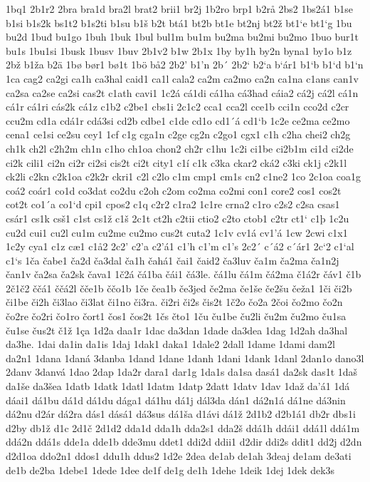 1bq1
2b1r2
2bra
bra1d
bra2l
brat2
brii1
br2j
1b2ro
brp1
b2rå
2bs2
1bs2á1
b1se
b1si
b1s2k
bs1t2
b1s2ti
b1su
b1š
b2t
btá1
bt2b
bt1e
bt2nj
bt2ž
bt1`e
bt1`g
1bu
bu2d
1buđ
bu1go
1buh
1buk
1bul
bul1m
bu1m
bu2ma
bu2mi
bu2mo
1buo
bur1t
bu1s
1bu1si
1busk
1busv
1buv
2b1v2
b1w
2b1x
1by
by1h
by2n
byna1
by1o
b1z
2bž
b1ža
b2ä
1bø
bør1
bø1t
1bö
bå2
2b2'
b1'n
2b´
2b2`
b2`a
b`ár1
b1`b
b1`d
b1`n
1ca
cag2
ca2gi
ca1h
ca3hal
caid1
ca1l
cala2
ca2m
ca2mo
ca2n
ca1na
c1ans
can1v
ca2sa
ca2se
ca2si
cas2t
c1ath
cavi1
1c2á
cá1di
cá1ha
cá3had
cáia2
cá2j
cá2l
cá1n
cá1r
cá1ri
cás2k
cá1z
c1b2
c2be1
cbs1i
2c1c2
cca1
cca2l
cce1b
cci1n
cco2d
c2cr
ccu2m
cd1a
cdá1r
cdá3si
cd2b
cdbe1
c1de
cd1o
cd1´á
cd1`b
1c2e
ce2ma
ce2mo
cena1
ce1si
ce2su
cey1
1cf
c1g
cga1n
c2ge
cg2n
c2go1
cgx1
c1h
c2ha
chei2
ch2g
ch1k
ch2l
c2h2m
ch1n
c1ho
ch1oa
chon2
ch2r
c1hu
1c2i
ci1be
ci2b1m
ci1d
ci2de
ci2k
cili1
ci2n
ci2r
ci2si
cis2t
ci2t
city1
c1í
c1k
c3ka
ckar2
cká2
c3ki
ck1j
c2k1l
ck2li
c2kn
c2k1oa
c2k2r
ckri1
c2l
c2lo
c1m
cmp1
cm1s
cn2
c1ne2
1co
2c1oa
coa1g
coá2
coár1
co1d
co3dat
co2du
c2oh
c2om
co2ma
co2mi
con1
core2
cos1
cos2t
cot2t
co1´a
co1`d
cpi1
cpos2
c1q
c2r2
c1ra2
1c1re
crna2
c1ro
c2s2
c2sa
csas1
csár1
cs1k
csš1
c1st
cs1ž
c1š
2c1t
ct2h
c2tii
ctio2
c2to
ctob1
c2tr
ct1`
c1þ
1c2u
cu2d
cui1
cu2l
cu1m
cu2me
cu2mo
cus2t
cuta2
1c1v
cv1á
cv1'á
1cw
2cwi
c1x1
1c2y
cya1
c1z
cæ1
c1å2
2c2'
c2'a
c2'á1
c1'h
c1'm
c1's
2c2´
c´á2
c´ár1
2c`2
c1`al
c1`s
1ča
čabe1
ča2d
ča3dal
ča1h
čahá1
čai1
čaid2
ča3luv
ča1m
ča2ma
ča1n2j
čan1v
ča2sa
ča2sk
čava1
1č2á
čá1ba
čái1
čá3le.
čá1lu
čá1m
čá2ma
č1á2r
čáv1
č1b
2č1č2
ččá1
ččá2l
čče1b
ččo1b
1če
čea1b
če3jed
če2ma
če1še
če2šu
čeža1
1či
či2b
či1be
či2h
či3lao
či3lat
či1no
či3ra.
či2ri
či2s
čis2t
1č2o
čo2a
2čoi
čo2mo
čo2n
čo2re
čo2ri
čo1ro
čort1
čos1
čos2t
1čs
čto1
1ču
ču1be
ču2li
ču2m
ču2mo
ču1sa
ču1se
čus2t
č1ž
1ça
1d2a
daa1r
1dac
da3dan
1dade
da3dea
1dag
1d2ah
da3hal
da3he.
1dai
da1in
da1is
1daj
1dak1
daka1
1dale2
2dall
1dame
1dami
dam2l
da2n1
1dana
1daná
3danba
1dand
1dane
1danh
1dani
1dank
1danl
2dan1o
dano3l
2danv
3danvá
1dao
2dap
1da2r
dara1
dar1g
1da1s
da1sa
dasá1
da2sk
das1t
1daš
da1še
da3šea
1datb
1datk
1datl
1datm
1datp
2datt
1datv
1dav
1daž
da'á1
1dá
dáai1
dá1bu
dá1d
dá1du
dága1
dá1hu
dá1j
dál3da
dán1
dá2n1á
dá1ne
dá3nin
dá2nu
d2ár
dá2ra
dás1
dásá1
dá3sus
dá1ša
d1ávi
dá1ž
2d1b2
d2b1á1
db2r
dbs1i
d2by
db1ž
d1c
2d1č
2d1d2
dda1d
dda1h
dda2s1
dda2š
ddá1h
ddái1
ddá1l
ddá1m
ddá2n
ddá1s
dde1a
dde1b
dde3mu
ddet1
ddi2d
ddii1
d2dir
ddi2s
ddit1
dd2j
d2dn
d2d1oa
ddo2n1
ddos1
ddu1h
ddus2
1d2e
2dea
de1ab
de1ah
3deaj
de1am
de3ati
de1b
de2ba
1debe1
1dede
1dee
de1f
de1g
de1h
1dehe
1deik
1dej
1dek
dek3s
